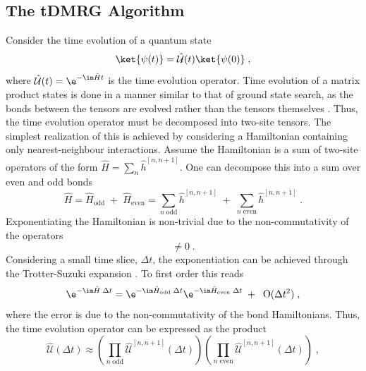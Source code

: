 \subsection{The tDMRG Algorithm}
Consider the time evolution of a quantum state
\begin{equation}
	\ket{\psi (t)} = \hat{\mathcal{U}}(t) \ket{\psi (0)} \; ,
\end{equation}
where $\hat{\mathcal{U}}(t) = \e^{ - \im \hat{H} t }$ is the time evolution operator. 
Time evolution of a matrix product states is done in a manner similar to that of ground state search, as the bonds between the tensors are evolved rather than the tensors themselves \cite{Vidal2003,Vidal2004}. Thus, the time evolution operator must be decomposed into two-site tensors. The simplest realization of this is achieved by considering a Hamiltonian containing only nearest-neighbour interactions.
Assume the Hamiltonian is a sum of two-site operators of the form $\hat{H} = \sum_{n} \hat{h}^{[n , n+1]}$. One can decompose this into a sum over even and odd bonds \cite{Vidal2004}
\begin{equation}
	\hat{H} = \hat{H}_{\mathrm{odd}} \; + \; \hat{H}_{\mathrm{even}} = \sum_{n \; \mathrm{odd}} \hat{h}^{[n , n+1]} \; + \; \sum_{n \; \mathrm{even}} \hat{h}^{[n , n+1]} \; .
\end{equation}  
Exponentiating the Hamiltonian is non-trivial due to the non-commutativity of the operators
\begin{equation}
	[ \hat{h}_{\mathrm{odd}}^{[n , n+1]} \; , \; \hat{h}_{\mathrm{even}}^{[n , n+1]} ] \neq 0 \; .
\end{equation}
Considering a small time slice, $\Delta t$, the exponentiation can be achieved through the Trotter-Suzuki expansion \cite{Suzuki1991}. To first order this reads
\begin{equation}
	\e^{- \im \hat{H} \; \Delta t} = \e^{- \im \hat{H}_{\mathrm{odd}} \; \Delta t } \e^{- \im \hat{H}_{\mathrm{even}} \; \Delta t} \; + \; \;  \mathrm{O}(\Delta t^2) \; ,
\end{equation}
where the error is due to the non-commutativity of the bond Hamiltonians. Thus, the time evolution operator can be expressed as the product
\begin{equation}
	\hat{\mathcal{U}}(\Delta t) \approx \left( \prod_{n \; \mathrm{odd}} \hat{\mathcal{U}}^{[n,n+1]} (\Delta t) \right) \left( \prod_{n \; \mathrm{even}} \hat{\mathcal{U}}^{[n,n+1]} (\Delta t) \right) \; , \label{eq:SuzukiTrotter1stOrder}
\end{equation}
